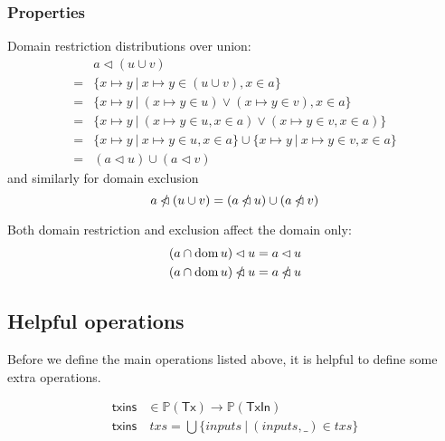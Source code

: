 \documentclass{article}
\newcommand{\powerset}[1]{\mathbb{P}(#1)}
\DeclareMathOperator{\dom}{dom}
\newcommand{\restrictdom}{\lhd}
\newcommand{\subtractdom}{\mathbin{\slashed{\restrictdom}}}
\begin{document}
\subsubsection{Properties}

Domain restriction distributions over union:
%
\begin{equation} \label{restrictdom_union}
\begin{split}
& a \restrictdom (u \cup v) \\
= & \{ x \mapsto y ~|~ x \mapsto y \in (u \cup v), x \in a \} \\
= & \{ x \mapsto y ~|~ (x \mapsto y \in u) \vee (x \mapsto y \in v), x \in a \} \\
= & \{ x \mapsto y ~|~ (x \mapsto y \in u, x \in a) \vee (x \mapsto y \in v, x \in a) \} \\
= & \{ x \mapsto y ~|~ x \mapsto y \in u, x \in a \} \cup \{ x \mapsto y ~|~ x \mapsto y \in v, x \in a \} \\
= & (a \restrictdom u) \cup (a \restrictdom v)
\end{split}
\end{equation}
%
and similarly for domain exclusion
%
\begin{equation} \label{subtractdom_union}
a \subtractdom (u \cup v) = (a \subtractdom u) \cup (a \subtractdom v)
\end{equation}

Both domain restriction and exclusion affect the domain only:
%
\begin{align}
(a \cap \dom u) \restrictdom u & = a \restrictdom u \label{restrictdom_dom} \\
(a \cap \dom u) \subtractdom u & = a \subtractdom u \label{subtractdom_dom}
\end{align}


\subsection{Helpful operations}

Before we define the main operations listed above, it is helpful to define some
extra operations.

\begin{equation}
\begin{split}
\mathsf{txins}& \in \powerset{\mathsf{Tx}} \to \powerset{\mathsf{TxIn}} \\
\mathsf{txins}& ~ txs = \bigcup \{ inputs ~|~ (inputs, \_) \in txs \}
\end{split}
\end{equation}
\end{document}
